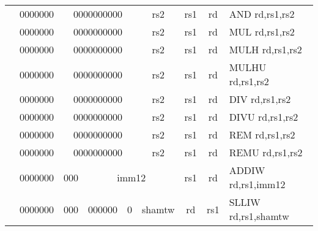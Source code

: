 \begin{table}[p]
\begin{small}
\begin{center}
\begin{tabular}{rcccccccccl}
&
\multicolumn{1}{|c|}{0000000} &
\multicolumn{5}{c|}{0000000000} &
\multicolumn{1}{c|}{rs2} &
\multicolumn{1}{c|}{rs1} &
\multicolumn{1}{c|}{rd} & AND rd,rs1,rs2 \\
\cline{2-10}
  

&
\multicolumn{1}{|c|}{0000000} &
\multicolumn{5}{c|}{0000000000} &
\multicolumn{1}{c|}{rs2} &
\multicolumn{1}{c|}{rs1} &
\multicolumn{1}{c|}{rd} & MUL rd,rs1,rs2 \\
\cline{2-10}
  

&
\multicolumn{1}{|c|}{0000000} &
\multicolumn{5}{c|}{0000000000} &
\multicolumn{1}{c|}{rs2} &
\multicolumn{1}{c|}{rs1} &
\multicolumn{1}{c|}{rd} & MULH rd,rs1,rs2 \\
\cline{2-10}
  

&
\multicolumn{1}{|c|}{0000000} &
\multicolumn{5}{c|}{0000000000} &
\multicolumn{1}{c|}{rs2} &
\multicolumn{1}{c|}{rs1} &
\multicolumn{1}{c|}{rd} & MULHU rd,rs1,rs2 \\
\cline{2-10}
  

&
\multicolumn{1}{|c|}{0000000} &
\multicolumn{5}{c|}{0000000000} &
\multicolumn{1}{c|}{rs2} &
\multicolumn{1}{c|}{rs1} &
\multicolumn{1}{c|}{rd} & DIV rd,rs1,rs2 \\
\cline{2-10}
  

&
\multicolumn{1}{|c|}{0000000} &
\multicolumn{5}{c|}{0000000000} &
\multicolumn{1}{c|}{rs2} &
\multicolumn{1}{c|}{rs1} &
\multicolumn{1}{c|}{rd} & DIVU rd,rs1,rs2 \\
\cline{2-10}
  

&
\multicolumn{1}{|c|}{0000000} &
\multicolumn{5}{c|}{0000000000} &
\multicolumn{1}{c|}{rs2} &
\multicolumn{1}{c|}{rs1} &
\multicolumn{1}{c|}{rd} & REM rd,rs1,rs2 \\
\cline{2-10}
  

&
\multicolumn{1}{|c|}{0000000} &
\multicolumn{5}{c|}{0000000000} &
\multicolumn{1}{c|}{rs2} &
\multicolumn{1}{c|}{rs1} &
\multicolumn{1}{c|}{rd} & REMU rd,rs1,rs2 \\
\cline{2-10}
  

&
\multicolumn{1}{|c|}{0000000} &
\multicolumn{2}{c|}{000} &
\multicolumn{4}{c|}{imm12} &
\multicolumn{1}{c|}{rs1} &
\multicolumn{1}{c|}{rd} & ADDIW rd,rs1,imm12 \\
\cline{2-10}
  

&
\multicolumn{1}{|c|}{0000000} &
\multicolumn{2}{c|}{000} &
\multicolumn{2}{c|}{000000} &
\multicolumn{1}{c|}{0} &
\multicolumn{1}{c|}{shamtw} &
\multicolumn{1}{c|}{rd} &
\multicolumn{1}{c|}{rs1} & SLLIW rd,rs1,shamtw \\
\cline{2-10}
  


\end{tabular}
\end{center}
\end{small}
\end{table}
